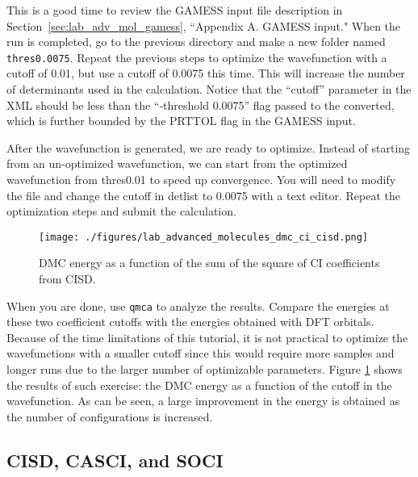This is a good time to review the GAMESS input file description in Section~\ref{sec:lab_adv_mol_gamess}, ``Appendix A. GAMESS input."
When the run is completed, go to the previous directory and make a new folder named
\texttt{thres0.0075}. Repeat the previous steps to optimize the wavefunction with a cutoff of 0.01, but use a cutoff of 0.0075 this time. This will increase the number of determinants used in the calculation. Notice that the ``cutoff'' parameter in the XML should be less than the ``-threshold 0.0075'' flag passed to the converted, which is further bounded by the PRTTOL flag in the GAMESS input.

After the wavefunction is generated, we are ready to optimize. Instead of starting from an un-optimized wavefunction, we can start from the optimized wavefunction from thres0.01 to speed up convergence. You will need to modify the file and change the cutoff in detlist to 0.0075 with a text editor. Repeat the optimization steps and submit the calculation.

\begin{figure}
\begin{center}
\texttt{[image: ./figures/lab\_advanced\_molecules\_dmc\_ci\_cisd.png]}
\end{center}
\caption{DMC energy as a function of the sum of the square of CI coefficients from CISD.}
\label{fig:lam_dmc_ci_cisd}
\end{figure}

When you are done, use \texttt{qmca} to analyze the results. Compare the energies at these two
coefficient cutoffs with the energies obtained with DFT orbitals. Because of the time limitations of this tutorial, it is not practical to optimize the wavefunctions with a smaller cutoff since this would require more samples and longer runs due to the larger number of optimizable parameters. Figure \ref{fig:lam_dmc_ci_cisd} shows the results of such exercise: the DMC energy as a function of the cutoff in the wavefunction. As can be seen, a large improvement in the energy is obtained as the number of configurations is increased.



\subsection{CISD, CASCI, and SOCI}

